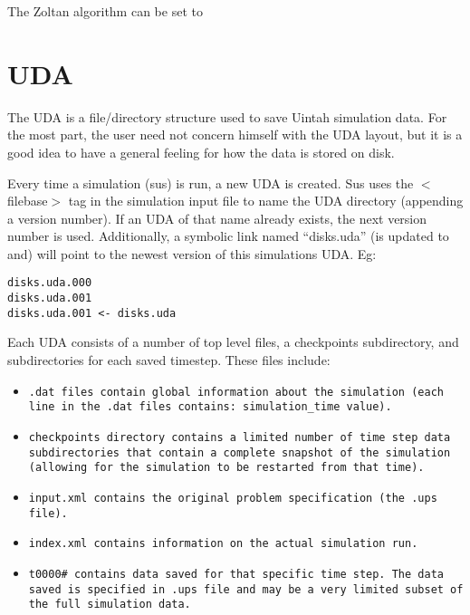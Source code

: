 The Zoltan algorithm can be set to   

\section{UDA}


The UDA is a file/directory structure used to save Uintah simulation
data.  For the most part, the user need not concern himself with the
UDA layout, but it is a good idea to have a general feeling for how
the data is stored on disk.


Every time a simulation (sus) is run, a new UDA is created.  Sus uses
the $<$filebase$>$ tag in the simulation input file to name the UDA
directory (appending a version number).  If an UDA of that name
already exists, the next version number is used.  Additionally, a
symbolic link named ``disks.uda'' (is updated to and) will point to
the newest version of this simulations UDA.  Eg:

\begin{Verbatim}[fontsize=\footnotesize]
disks.uda.000
disks.uda.001
disks.uda.001 <- disks.uda
\end{Verbatim}


Each UDA consists of a number of top level files, a checkpoints
subdirectory, and subdirectories for each saved timestep.  These files
include:

\begin{itemize}

\item \tt.dat \normalfont files contain global information about the
  simulation (each line in the .dat files contains: simulation\_time
  value).
\item \tt checkpoints \normalfont directory contains a limited
  number of time step data subdirectories that contain a complete
  snapshot of the simulation (allowing for the simulation to be
  restarted from that time).
\item \tt input.xml \normalfont contains the original problem
  specification (the .ups file).
\item \tt index.xml \normalfont contains information on the actual
  simulation run.
\item \tt t0000\# \normalfont contains data saved for that specific
  time step.  The data saved is specified in .ups file and may be a
  very limited subset of the full simulation data.

\end{itemize}

